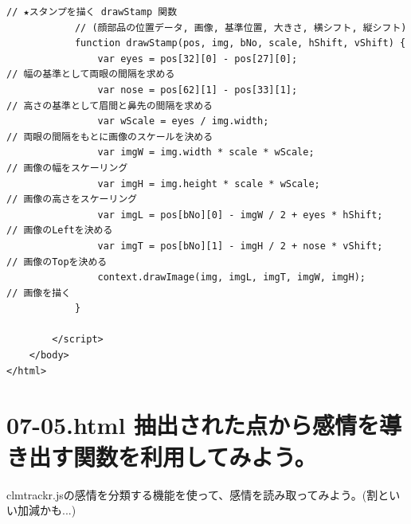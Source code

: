 \documentclass[mingoth,11pt,a4j,uplatex]{jsarticle}
\begin{document}
\begin{lstlisting}[caption=07-04.html]
            // ★スタンプを描く drawStamp 関数
            // (顔部品の位置データ, 画像, 基準位置, 大きさ, 横シフト, 縦シフト)
            function drawStamp(pos, img, bNo, scale, hShift, vShift) {
                var eyes = pos[32][0] - pos[27][0];                   // 幅の基準として両眼の間隔を求める
                var nose = pos[62][1] - pos[33][1];                   // 高さの基準として眉間と鼻先の間隔を求める
                var wScale = eyes / img.width;                        // 両眼の間隔をもとに画像のスケールを決める
                var imgW = img.width * scale * wScale;                // 画像の幅をスケーリング
                var imgH = img.height * scale * wScale;               // 画像の高さをスケーリング
                var imgL = pos[bNo][0] - imgW / 2 + eyes * hShift;    // 画像のLeftを決める
                var imgT = pos[bNo][1] - imgH / 2 + nose * vShift;    // 画像のTopを決める
                context.drawImage(img, imgL, imgT, imgW, imgH);       // 画像を描く
            }
            
        </script>
    </body>
</html>
\end{lstlisting}

\newpage
\section{07-05.html 抽出された点から感情を導き出す関数を利用してみよう。}
clmtrackr.jsの感情を分類する機能を使って、感情を読み取ってみよう。(割といい加減かも...)
\end{document}
